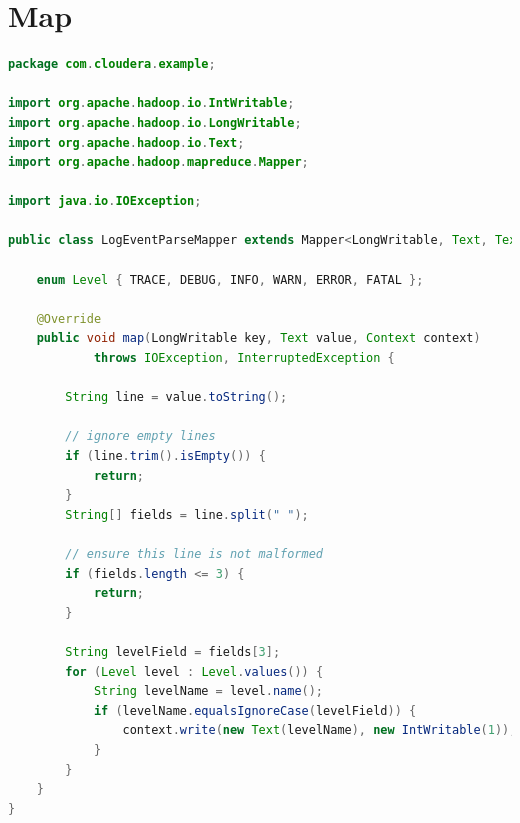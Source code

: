 \section{Map} \label{sec:hadoop-map}
\begin{lstlisting}[language=Java, commentstyle=\color{pgreen}, keywordstyle=\color{pblue}, stringstyle=\color{pred},basicstyle=\fontsize{6}{5}\selectfont\ttfamily, xleftmargin=0.8cm]
package com.cloudera.example;

import org.apache.hadoop.io.IntWritable;
import org.apache.hadoop.io.LongWritable;
import org.apache.hadoop.io.Text;
import org.apache.hadoop.mapreduce.Mapper;

import java.io.IOException;

public class LogEventParseMapper extends Mapper<LongWritable, Text, Text, IntWritable> {
    
    enum Level { TRACE, DEBUG, INFO, WARN, ERROR, FATAL };

    @Override
    public void map(LongWritable key, Text value, Context context)
            throws IOException, InterruptedException {

        String line = value.toString();

        // ignore empty lines
        if (line.trim().isEmpty()) {
            return;
        }
        String[] fields = line.split(" ");

        // ensure this line is not malformed
        if (fields.length <= 3) {
            return;
        }

        String levelField = fields[3];
        for (Level level : Level.values()) {
            String levelName = level.name();
            if (levelName.equalsIgnoreCase(levelField)) {
                context.write(new Text(levelName), new IntWritable(1));
            }
        }
    }
}
\end{lstlisting}
\newpage
